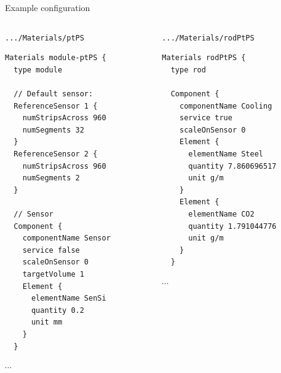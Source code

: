\documentclass[pdftex, 11pt]{beamer}
\newcommand{\pat}[1]{\texttt{#1}}
\begin{document}
\begin{frame}[fragile]{Example configuration}
  \tiny
  \begin{columns}[t]
    \begin{column}{0.47\textwidth}
      \begin{block}{\pat{.../Materials/ptPS}}
\begin{verbatim}
Materials module-ptPS {
  type module

  // Default sensor:
  ReferenceSensor 1 {
    numStripsAcross 960
    numSegments 32
  }
  ReferenceSensor 2 {
    numStripsAcross 960
    numSegments 2
  } 

  // Sensor
  Component {
    componentName Sensor
    service false
    scaleOnSensor 0
    targetVolume 1
    Element {
      elementName SenSi
      quantity 0.2
      unit mm
    }
  }
\end{verbatim}
$\cdots$
      \end{block}
    \end{column}
    \begin{column}{0.47\textwidth}
      \begin{block}{\pat{.../Materials/rodPtPS}}
\begin{verbatim}
Materials rodPtPS {
  type rod

  Component {
    componentName Cooling
    service true
    scaleOnSensor 0
    Element {
      elementName Steel
      quantity 7.860696517
      unit g/m
    }
    Element {
      elementName CO2
      quantity 1.791044776
      unit g/m
    }
  }
\end{verbatim}
$\cdots$
      \end{block}
    \end{column}
  \end{columns}
\end{frame}
\end{document}
